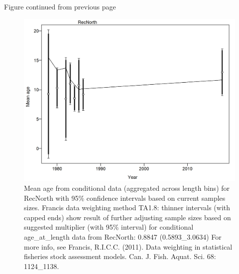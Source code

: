 \documentclass[12pt,]{article}
\begin{document}
\begin{center} 

              Figure continued from previous page 

             \end{center}

\begin{figure}
\centering
\includegraphics{./r4ss/plots_mod1/comp_condAALfit_data_weighting_TA1.8_condAgeRecNorth.png}
\caption{Mean age from conditional data (aggregated across length bins)
for RecNorth with 95\% confidence intervals based on current samples
sizes. Francis data weighting method TA1.8: thinner intervals (with
capped ends) show result of further adjusting sample sizes based on
suggested multiplier (with 95\% interval) for conditional
age\_at\_length data from RecNorth: 0.8847 (0.5893\_3.0634) For more
info, see Francis, R.I.C.C. (2011). Data weighting in statistical
fisheries stock assessment models. Can. J. Fish. Aquat. Sci. 68:
1124\_1138.
\label{fig:mod1_8_comp_condAALfit_data_weighting_TA1.8_condAgeRecNorth}}
\end{figure}
\end{document}

